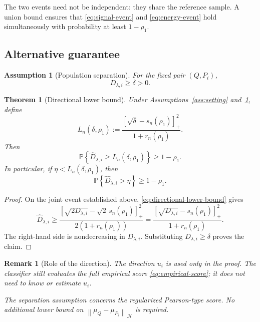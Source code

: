 \documentclass[11pt]{article}
\newcommand{\HH}{\mathcal H}
\newcommand{\Prob}{\mathbb P}
\newcommand{\norm}[1]{\left\lVert #1\right\rVert_{\HH}}
\newcommand{\pos}[1]{\left[#1\right]_+}
\newtheorem{assumption}{Assumption}
\newtheorem{theorem}{Theorem}
\newtheorem{remark}{Remark}
\begin{document}
The two events need not be independent: they share the
reference sample. A union bound ensures that
\eqref{eq:signal-event} and \eqref{eq:energy-event}
hold simultaneously with probability at least $1-\rho_1$.

\subsection{Alternative guarantee}

\begin{assumption}[Population separation]
\label{ass:separation}
For the fixed pair $(Q,P_i)$,
\[
    D_{\lambda,i}\ge\delta>0.
\]
\end{assumption}

\begin{theorem}[Directional lower bound]
\label{thm:alternative}
Under Assumptions~\ref{ass:setting}
and~\ref{ass:separation}, define
\begin{equation}
    L_n(\delta,\rho_1)
    :=
    \frac{
        \pos{\sqrt\delta-s_n(\rho_1)}^2
    }{
        1+r_n(\rho_1)
    }.
    \label{eq:alternative-bound}
\end{equation}
Then
\[
    \Prob\left\{
        \widehat D_{\lambda,i}
        \ge L_n(\delta,\rho_1)
    \right\}
    \ge1-\rho_1.
\]
In particular, if $\eta<L_n(\delta,\rho_1)$, then
\[
    \Prob\left\{
        \widehat D_{\lambda,i}>\eta
    \right\}
    \ge1-\rho_1.
\]
\end{theorem}

\begin{proof}
On the joint event established above,
\eqref{eq:directional-lower-bound} gives
\[
    \widehat D_{\lambda,i}
    \ge
    \frac{
        \pos{
            \sqrt{2D_{\lambda,i}}
            -\sqrt2\,s_n(\rho_1)
        }^2
    }{
        2(1+r_n(\rho_1))
    }
    =
    \frac{
        \pos{\sqrt{D_{\lambda,i}}-s_n(\rho_1)}^2
    }{
        1+r_n(\rho_1)
    }.
\]
The right-hand side is nondecreasing in $D_{\lambda,i}$.
Substituting $D_{\lambda,i}\ge\delta$ proves the claim.
\end{proof}

\begin{remark}[Role of the direction]
The direction $u_i$ is used only in the proof.
The classifier still evaluates the full empirical score
\eqref{eq:empirical-score}; it does not need to know or
estimate $u_i$.

The separation assumption concerns the regularized
Pearson-type score. No additional lower bound on
$\norm{\mu_Q-\mu_{P_i}}$ is required.
\end{remark}
\end{document}
